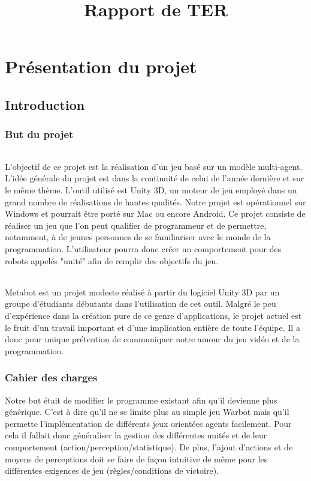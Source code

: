 \documentclass{report}
\title{Rapport de TER}
\begin{document}
\maketitle
\newpage
\tableofcontents
\newpage

\part{Présentation du projet}
\chapter{Introduction}
\section{But du projet}
\paragraph{}
L'objectif de ce projet est la réalisation d'un jeu basé sur un modèle multi-agent. L'idée générale du projet est dans la continuité de celui de l'année dernière et sur le même thème. L'outil utilisé est Unity 3D, un moteur de jeu employé dans un grand nombre de réalisations de hautes qualités. Notre projet est opérationnel sur Windows et pourrait être porté sur Mac ou encore Android.
Ce projet consiste de réaliser un jeu que l'on peut qualifier de programmeur et de permettre, notamment, à de jeunes personnes de se familiariser avec le monde de la programmation. L'utilisateur pourra donc créer un comportement pour des robots appelés "unité" afin de remplir des objectifs du jeu.
\paragraph{}
Metabot est un projet modeste réalisé à partir du logiciel Unity 3D par un groupe d'étudiants débutants dans l'utilisation de cet outil. Malgré le peu d'expérience dans la création pure de ce genre d'applications, le projet actuel est le fruit d'un travail important et d'une implication entière de toute l'équipe.
Il a donc pour unique prétention de communiquer notre amour du jeu vidéo et de la programmation.

\section{Cahier des charges}

Notre but était de modifier le programme existant afin qu'il devienne plus générique. C'est à dire qu'il ne se limite plus au simple jeu Warbot mais qu'il permette l'implémentation de différents jeux orientées agents facilement. 
Pour cela il fallait donc généraliser la gestion des différentes unités et de leur comportement (action/perception/statistique). De plus, l'ajout d'actions et de moyens de perceptions doit se faire de façon intuitive de même pour les différentes exigences de jeu (règles/conditions de victoire). 
\end{document}
